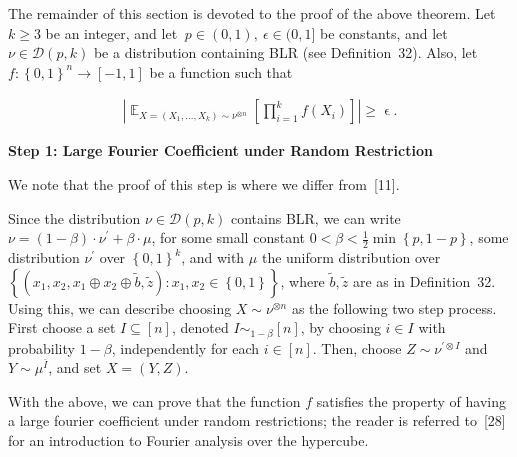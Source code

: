 \documentclass[10pt,a4paper]{article}
\begin{document}



The remainder of this section is devoted to the proof of the above theorem.
Let $k\geqslant 3$ be an integer, and let $\ p\in(0,1),\ \epsilon\in(0,1]$ be constants, and let $\nu\in\mathcal{D}(p,k)$ be a distribution containing BLR (see Definition 32).
Also, let $f:\left\{0,1\right\}^{n}\to[-1,1]$ be a function such that\par


\[\begin{gathered}
\left|\mathop{\mathbb{E}}_{X=(X_{1},\dots,X_{k})\sim\nu^{\otimes n}}\left[\prod_{i=1}^{k}f(X_{i})\right]\right|\geqslant\mathop{\epsilon}.
\end{gathered}\]




\par\medskip\noindent\textbf{Step 1: Large Fourier Coefficient under Random Restriction}\par




We note that the proof of this step is where we differ from [11].\par




Since the distribution $\nu\in\mathcal{D}(p,k)$ contains BLR, we can write $\nu=(1-\beta)\cdot\nu^{\prime}+\beta\cdot\mu$, for some small constant $0<\beta<\frac{1}{2}\min\left\{p,1-p\right\}$, some distribution $\nu^{\prime}$ over $\left\{0,1\right\}^{k}$, and with $\mu$ the uniform distribution over $\left\{(x_{1},x_{2},x_{1}\oplus x_{2}\oplus\tilde{b},\tilde{z}):x_{1},x_{2}\in\left\{0,1\right\}\right\}$, where $\tilde{b},\tilde{z}$ are as in Definition 32.
Using this, we can describe choosing $X\sim\nu^{\otimes n}$ as the following two step process. First choose a set $I\subseteq[n]$, denoted $I\sim_{1-\beta}[n]$, by choosing $i\in I$ with probability $1-\beta$, independently for each $i\in[n]$.
Then, choose $Z\sim\nu^{\prime\otimes I}$ and $Y\sim\mu^{\bar{I}}$, and set $X=(Y,Z)$.\par




With the above, we can prove that the function $f$ satisfies the property of having a large fourier coefficient under random restrictions; the reader is referred to [28] for an introduction to Fourier analysis over the hypercube.\par



\end{document}
